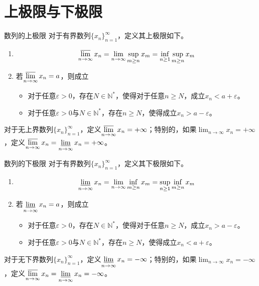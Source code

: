 \documentclass[lang = cn, scheme = chinese, thmcnt = section]{elegantbook}
\newcommand{\N}{\mathbb{N}}            %
\begin{document}
\section{上极限与下极限}

\begin{definition}{数列的上极限}
	对于有界数列$\{x_n\}_{n=1}^{\infty}$，定义其上极限如下。
	\begin{enumerate}
		\item 
		$$
		\varlimsup_{n\to\infty}{x_n}=\lim_{n\to\infty}{\sup_{m\ge n}{x_m}}=\inf_{n\ge 1}{\sup_{m\ge n}{x_m}}
		$$
		\item 若$\displaystyle\varlimsup_{n\to\infty}{x_n}=a$，则成立
		\begin{itemize}
			\item 对于任意$\varepsilon>0$，存在$N\in\N^*$，使得对于任意$n\ge N$，成立$x_n< a+\varepsilon$。
			\item 对于任意$\varepsilon>0$与$N\in\N^*$，存在$n\ge N$，使得成立$x_n> a-\varepsilon$。
		\end{itemize}
	\end{enumerate}
	
	对于无上界数列$\{x_n\}_{n=1}^{\infty}$，定义$\displaystyle\varlimsup_{n\to\infty}{x_n}=+\infty$；特别的，如果$\displaystyle\lim_{n\to\infty}{x_n}=+\infty$，定义$\displaystyle\varlimsup_{n\to\infty}{x_n}=\varliminf_{n\to\infty}{x_n}=+\infty$。
\end{definition}

\begin{definition}{数列的下极限}
	对于有界数列$\{x_n\}_{n=1}^{\infty}$，定义其下极限如下。
	\begin{enumerate}
		\item 
		$$
		\varliminf_{n\to\infty}{x_n}=\lim_{n\to\infty}{\inf_{m\ge n}{x_m}}=\sup_{n\ge 1}{\inf_{m\ge n}{x_m}}
		$$
		\item 若$\displaystyle\varliminf_{n\to\infty}{x_n}=a$，则成立
		\begin{itemize}
			\item 对于任意$\varepsilon>0$，存在$N\in\N^*$，使得对于任意$n\ge N$，成立$x_n> a-\varepsilon$。
			\item 对于任意$\varepsilon>0$与$N\in\N^*$，存在$n\ge N$，使得成立$x_n< a+\varepsilon$。
		\end{itemize}
	\end{enumerate}
	
	对于无下界数列$\{x_n\}_{n=1}^{\infty}$，定义$\displaystyle\varliminf_{n\to\infty}{x_n}=-\infty$；特别的，如果$\displaystyle\lim_{n\to\infty}{x_n}=-\infty$，定义$\displaystyle\varlimsup_{n\to\infty}{x_n}=\varliminf_{n\to\infty}{x_n}=-\infty$。
\end{definition}
\end{document}
